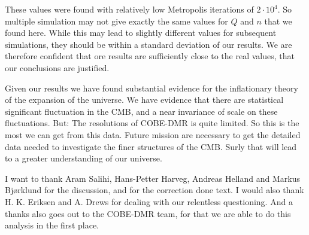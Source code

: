 \documentclass{emulateapj}
\begin{document}
These values were found with relatively low Metropolis iterations of $2\cdot10^4$. So multiple simulation may not give exactly the same values for $Q$ and $n$ that we found here. While this may lead to slightly different values for subsequent simulations, they should be within a standard deviation of our results. We are therefore confident that ore results are sufficiently close to the real values, that our conclusions are justified.

Given our results we have found substantial evidence for the inflationary theory of the expansion of the universe. We have evidence that there are statistical significant fluctuation in the CMB, and a near invariance of scale on these fluctuations. But: The resolutions of COBE-DMR is quite limited. So this is the most we can get from this data. Future mission are necessary to get the detailed data needed to investigate the finer structures of the CMB. Surly that will lead to a greater understanding of our universe.













\begin{acknowledgements}
I want to thank Aram Salihi, Hans-Petter Harveg, Andreas Helland and Markus Bjørklund for the discussion, and for the correction done text. I would also thank H. K. Eriksen and A. Drews for dealing with our relentless questioning. And a thanks also goes out to the COBE-DMR team, for that we are able to do this analysis in the first place.
\end{acknowledgements}






%
%
\end{document}
